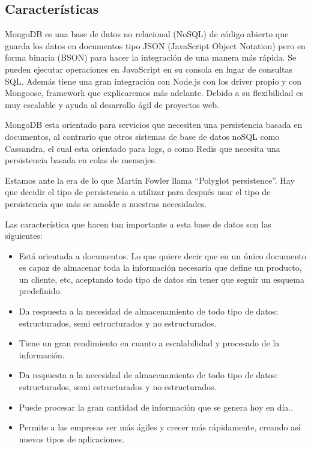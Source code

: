 \subsection{Características}
MongoDB es una base de datos no relacional (NoSQL) de código abierto que guarda los datos en documentos tipo JSON (JavaScript Object Notation) pero en forma binaria (BSON) para hacer la integración de una manera más rápida. Se pueden ejecutar operaciones en JavaScript en su consola en lugar de consultas SQL. Además tiene una gran integración con Node.js con los driver propio y con Mongoose, framework que explicaremos más adelante. Debido a su flexibilidad es muy escalable y ayuda al desarrollo ágil de proyectos web.

MongoDB esta orientado para servicios que necesiten una persistencia basada en documentos, al contrario que otros sistemas de base de datos noSQL como Cassandra, el cual esta orientado para logs, o como Redis que necesita una persistencia basada en colas de mensajes.

Estamos ante la era de lo que Martin Fowler llama “Polyglot
persistence”. Hay que decidir el tipo de persistencia a
utilizar para después usar el tipo de persistencia que más
se amolde a nuestras necesidades.

Las característica que hacen tan importante a esta base de datos son las siguientes:



\begin{itemize}

    \item Está orientada a documentos. Lo que quiere decir que en un único documento es capaz de almacenar toda la información necesaria que define un producto, un cliente, etc, aceptando todo tipo de datos sin tener que seguir un esquema predefinido.
    
    \item Da respuesta a la necesidad de almacenamiento de todo tipo de datos: estructurados, semi estructurados y no estructurados. 
    
    \item Tiene un gran rendimiento en cuanto a escalabilidad y procesado de la información.
    
    \item Da respuesta a la necesidad de almacenamiento de todo tipo de datos: estructurados, semi estructurados y no estructurados. 
    
    \item Puede procesar la gran cantidad de información que se genera hoy en día..
    
    \item Permite a las empresas ser más ágiles y crecer más rápidamente, creando así nuevos tipos de aplicaciones.
    
    
\end{itemize}


